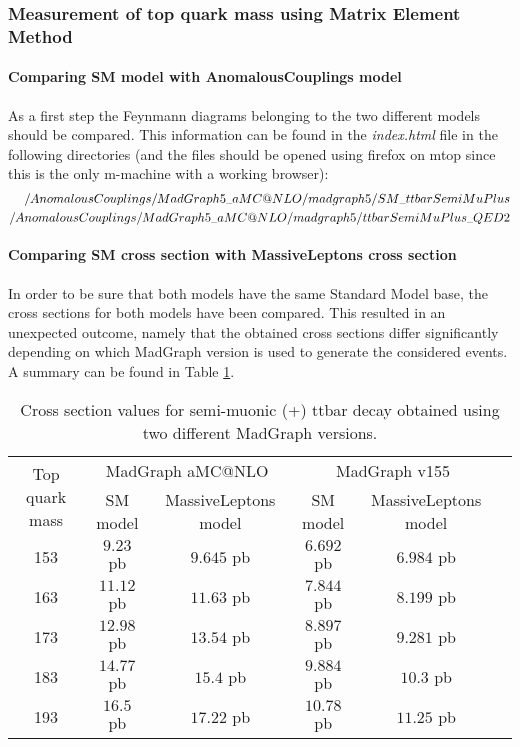 \subsubsection{Measurement of top quark mass using Matrix Element Method}

\paragraph{Comparing SM model with AnomalousCouplings model\\}
As a first step the Feynmann diagrams belonging to the two different models should be compared. This information can be found in the \textit{index.html} file in the following directories (and the files should be opened using firefox on mtop since this is the only m-machine with a working browser):
\begin{eqnarray*}
 \tiny{/AnomalousCouplings/MadGraph5\_aMC@NLO/madgraph5/SM\_ttbarSemiMuPlus} \\
 \tiny{/AnomalousCouplings/MadGraph5\_aMC@NLO/madgraph5/ttbarSemiMuPlus\_QED2}
\end{eqnarray*}

\paragraph{Comparing SM cross section with MassiveLeptons cross section\\}
In order to be sure that both models have the same Standard Model base, the cross sections for both models have been compared. This resulted in an unexpected outcome, namely that the obtained cross sections differ significantly depending on which MadGraph version is used to generate the considered events. A summary can be found in Table \ref{table::MGXS}.
\begin{table}[h!]
 \centering
 \begin{tabular}{|c|c|c|c|c|c|}
  \hline
  \multirow{2}{*}{Top quark mass}	&  \multicolumn{2}{|c|}{MadGraph aMC@NLO}	& \multicolumn{2}{|c|}{MadGraph v155}  	\\
					&  SM model	& MassiveLeptons model		& SM model 	& MassiveLeptons model	\\
  \hline
    153 				& $9.23$ pb	& $9.645$ pb			& $6.692$ pb	& $6.984$ pb		\\
    163					& $11.12$ pb	& $11.63$ pb			& $7.844$ pb	& $8.199$ pb		\\
    173					& $12.98$ pb	& $13.54$ pb			& $8.897$ pb	& $9.281$ pb		\\
    183					& $14.77$ pb	& $15.4$ pb			& $9.884$ pb	& $10.3$ pb		\\
    193					& $16.5$ pb	& $17.22$ pb			& $10.78$ pb	& $11.25$ pb		\\
  \hline 
 \end{tabular} 
 \caption{Cross section values for semi-muonic (+) ttbar decay obtained using two different MadGraph versions.} \label{table::MGXS}
\end{table}

